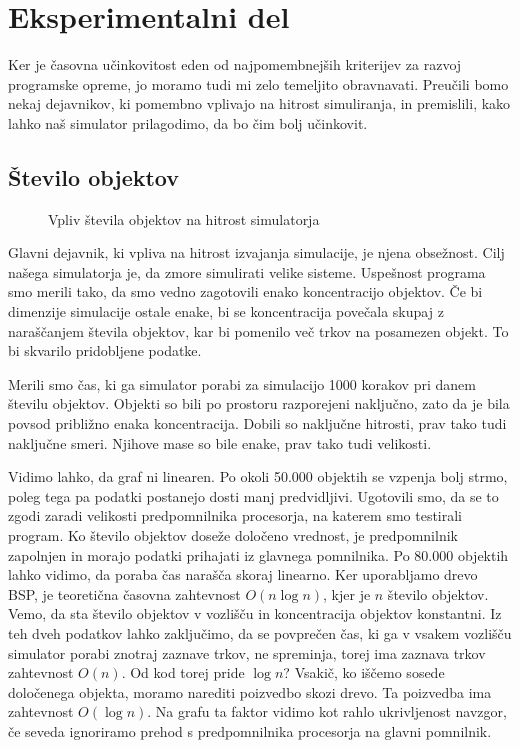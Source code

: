 \documentclass[a4paper,12pt]{article}
\begin{document}
\section{Eksperimentalni del}

Ker je časovna učinkovitost eden od najpomembnejših kriterijev za razvoj programske opreme,
jo moramo tudi mi zelo temeljito obravnavati. Preučili bomo nekaj dejavnikov, ki pomembno
vplivajo na hitrost simuliranja, in premislili, kako lahko naš simulator prilagodimo,
da bo čim bolj učinkovit. 

\subsection{Število objektov}

\begin{figure}
    \caption{Vpliv števila objektov na hitrost simulatorja}
\end{figure}

Glavni dejavnik, ki vpliva na hitrost izvajanja simulacije, je njena obsežnost. Cilj našega simulatorja je,
da zmore simulirati velike sisteme. Uspešnost programa smo merili tako, da smo vedno zagotovili enako
koncentracijo objektov. Če bi dimenzije simulacije ostale enake, bi se koncentracija povečala skupaj
z naraščanjem števila objektov, kar bi pomenilo več trkov na posamezen objekt. To bi skvarilo pridobljene podatke. 

Merili smo čas, ki ga simulator porabi za simulacijo 1000 korakov pri danem številu objektov.
Objekti so bili po prostoru razporejeni naključno, zato da je bila povsod približno enaka koncentracija. Dobili so
naključne hitrosti, prav tako tudi naključne smeri. Njihove mase so bile enake, prav tako tudi velikosti. 

Vidimo lahko, da graf ni linearen. Po okoli 50.000 objektih se vzpenja bolj strmo, poleg tega pa podatki
postanejo dosti manj predvidljivi. Ugotovili smo, da se to zgodi zaradi velikosti predpomnilnika procesorja, na
katerem smo testirali program. Ko število objektov doseže določeno vrednost, je predpomnilnik zapolnjen in
morajo podatki prihajati iz glavnega pomnilnika. Po 80.000 objektih lahko vidimo, da poraba čas narašča skoraj linearno.
Ker uporabljamo drevo BSP, je teoretična časovna zahtevnost $O(n \log n)$, kjer je $n$ število objektov.
Vemo, da sta število objektov v vozlišču in koncentracija objektov konstantni. Iz teh dveh podatkov
lahko zaključimo, da se povprečen čas, ki ga v vsakem vozlišču simulator porabi znotraj zaznave trkov, ne spreminja,
torej ima zaznava trkov zahtevnost $O(n)$. Od kod torej pride $\log n$?
Vsakič, ko iščemo sosede določenega objekta, moramo narediti poizvedbo skozi drevo. Ta poizvedba ima zahtevnost $O(\log n)$. 
Na grafu ta faktor vidimo kot rahlo ukrivljenost navzgor, če seveda ignoriramo prehod s predpomnilnika procesorja na glavni pomnilnik.
\end{document}
